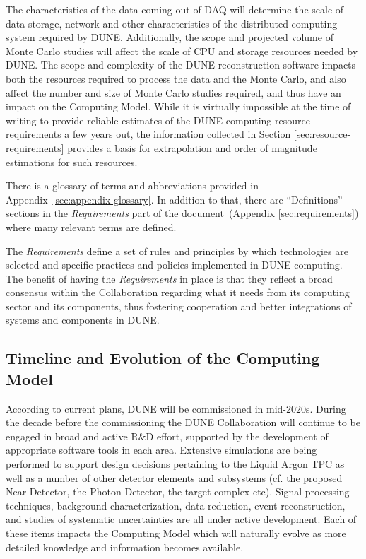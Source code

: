 The characteristics of the data coming out of DAQ will determine the scale of data storage, network
and other characteristics of the distributed computing system required by DUNE.  Additionally, the scope and projected
volume of Monte Carlo studies  will affect the scale of CPU and storage resources needed by DUNE.  The scope and complexity of the DUNE
reconstruction software impacts both the resources required to process the data and the Monte Carlo, and also affect the
number and size of Monte Carlo studies required, and thus have an impact on the Computing Model. While it is virtually
impossible at the time of writing to provide reliable estimates of the DUNE computing resource requirements a few years out,
the information collected in Section \ref{sec:resource-requirements} provides a basis for extrapolation and order of magnitude
estimations for such resources.

There is a glossary of terms and abbreviations provided in Appendix~\ref{sec:appendix-glossary}. In addition to that,
there are ``Definitions'' sections in the \textit{Requirements} part of the document~(Appendix \ref{sec:requirements}) where
many relevant terms are defined.

The \textit{Requirements}
define a set of rules and principles by which technologies are selected and specific practices and policies implemented in DUNE computing.
The benefit of having the \textit{Requirements} in place is that they reflect a broad consensus within the Collaboration regarding what it needs from
its computing sector and its components, thus fostering cooperation and better integrations of systems and components in DUNE.

\subsection{Timeline and Evolution of the Computing Model}
\label{sec:timeline}
According to current plans, DUNE will be commissioned in mid-2020s. During the decade before the commissioning
the DUNE Collaboration will continue to be engaged in broad and active R\&D effort, supported by the development of appropriate 
software tools in each area. Extensive simulations are being performed to support design decisions pertaining to the Liquid 
Argon TPC as well as a number of other detector elements and subsystems (cf. the proposed Near Detector, the Photon Detector, 
the target complex etc). Signal processing techniques, background characterization, data reduction, event reconstruction,
and studies of systematic  uncertainties are all under active development. Each of these items impacts the Computing Model
which will naturally evolve as more detailed knowledge and information becomes available.

